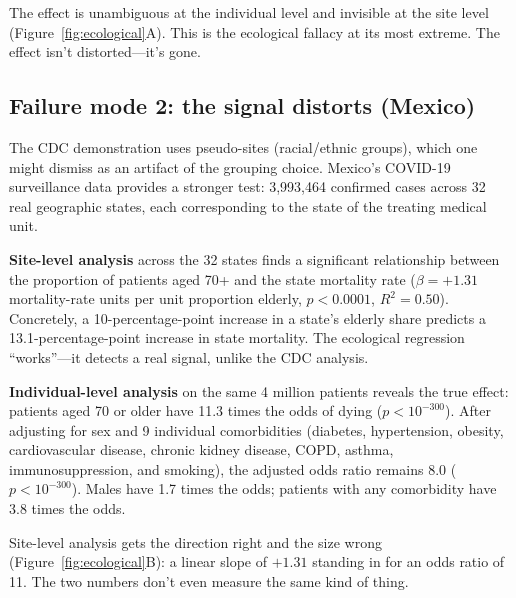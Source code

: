 \documentclass{article}
\begin{document}
The effect is unambiguous at the individual level and invisible at the site
level (Figure~\ref{fig:ecological}A).  This is the ecological fallacy at its most extreme.  The effect
isn't distorted---it's gone.


\subsection{Failure mode 2: the signal distorts (Mexico)}

The CDC demonstration uses pseudo-sites (racial/ethnic groups), which one
might dismiss as an artifact of the grouping choice.  Mexico's COVID-19
surveillance data provides a stronger test: 3,993,464 confirmed cases across
32 real geographic states, each corresponding to the state of the treating
medical unit.

\textbf{Site-level analysis} across the 32 states finds a significant
relationship between the proportion of patients aged 70+ and the state
mortality rate ($\beta = +1.31$ mortality-rate units per unit proportion
elderly, $p < 0.0001$, $R^2 = 0.50$).  Concretely, a 10-percentage-point
increase in a state's elderly share predicts a 13.1-percentage-point
increase in state mortality.  The ecological regression
``works''---it detects a real signal, unlike the CDC analysis.

\textbf{Individual-level analysis} on the same 4 million patients reveals the
true effect: patients aged 70 or older have 11.3 times the odds of dying
($p < 10^{-300}$).  After adjusting for sex and 9 individual comorbidities
(diabetes, hypertension, obesity, cardiovascular disease, chronic kidney
disease, COPD, asthma, immunosuppression, and smoking), the adjusted odds
ratio remains 8.0 ($p < 10^{-300}$).  Males have 1.7 times the odds;
patients with any comorbidity have 3.8 times the odds.

Site-level analysis gets the direction right and the size wrong (Figure~\ref{fig:ecological}B): a linear
slope of $+1.31$ standing in for an odds ratio of 11.  The two numbers
don't even measure the same kind of thing.
\end{document}
